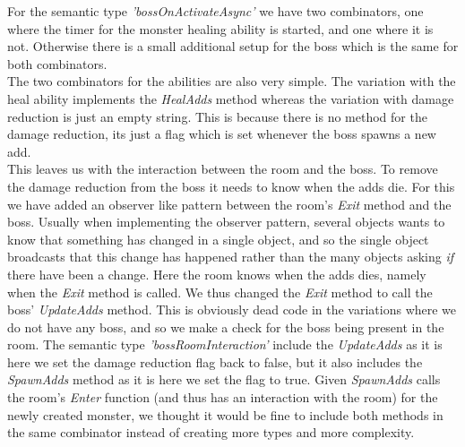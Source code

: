 For the semantic type \textit{'bossOnActivateAsync'} we have two combinators, one where the timer for the monster healing ability is started, and one where it is not. Otherwise there is a small additional setup for the boss which is the same for both combinators.\\
The two combinators for the abilities are also very simple. The variation with the heal ability implements the \textit{HealAdds} method whereas the variation with damage reduction is just an empty string. This is because there is no method for the damage reduction, its just a flag which is set whenever the boss spawns a new add.\\
This leaves us with the interaction between the room and the boss. To remove the damage reduction from the boss it needs to know when the adds die. For this we have added an observer like pattern between the room's \textit{Exit} method and the boss. Usually when implementing the observer pattern, several objects wants to know that something has changed in a single object, and so the single object broadcasts that this change has happened rather than the many objects asking \textit{if} there have been a change. Here the room knows when the adds dies, namely when the \textit{Exit} method is called. We thus changed the \textit{Exit} method to call the boss' \textit{UpdateAdds} method. This is obviously dead code in the variations where we do not have any boss, and so we make a check for the boss being present in the room. The semantic type \textit{'bossRoomInteraction'} include the \textit{UpdateAdds} as it is here we set the damage reduction flag back to false, but it also includes the \textit{SpawnAdds} method as it is here we set the flag to true. Given \textit{SpawnAdds} calls the room's \textit{Enter} function (and thus has an interaction with the room) for the newly created monster, we thought it would be fine to include both methods in the same combinator instead of creating more types and more complexity.\\
